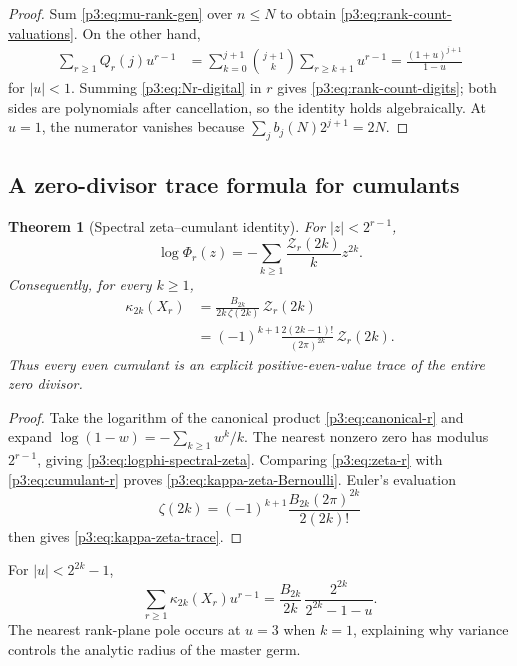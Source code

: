 \documentclass[11pt,oneside]{article}
\newtheorem{theorem}{Theorem}[section]
\theoremstyle{definition}
\theoremstyle{remark}
\begin{document}
\begin{proof}
Sum \eqref{p3:eq:mu-rank-gen} over $n\le N$ to obtain
\eqref{p3:eq:rank-count-valuations}.  On the other hand,
\begin{align*}
 \sum_{r\ge1}Q_r(j)u^{r-1}
 &=\sum_{k=0}^{j+1}\binom{j+1}{k}
   \sum_{r\ge k+1}u^{r-1}
 =\frac{(1+u)^{j+1}}{1-u}
\end{align*}
for $|u|<1$.  Summing \eqref{p3:eq:Nr-digital} in $r$ gives
\eqref{p3:eq:rank-count-digits}; both sides are polynomials after cancellation, so the identity holds algebraically.  At $u=1$, the numerator vanishes because
$\sum_jb_j(N)2^{j+1}=2N$.
\end{proof}

\subsection{A zero-divisor trace formula for cumulants}

\begin{theorem}[Spectral zeta--cumulant identity]\label{p3:thm:zeta-cumulant}
For $|z|<2^{r-1}$,
\begin{equation}\label{p3:eq:logphi-spectral-zeta}
 \boxed{\quad
 \log\Phi_r(z)=-\sum_{k\ge1}\frac{\mathcal Z_r(2k)}{k}z^{2k}.
 \quad}
\end{equation}
Consequently, for every $k\ge1$,
\begin{align}
 \kappa_{2k}(X_r)
 &=\frac{B_{2k}}{2k\,\zeta(2k)}\,\mathcal Z_r(2k)\label{p3:eq:kappa-zeta-Bernoulli}\\
 &=(-1)^{k+1}\frac{2(2k-1)!}{(2\pi)^{2k}}
   \,\mathcal Z_r(2k).\label{p3:eq:kappa-zeta-trace}
\end{align}
Thus every even cumulant is an explicit positive-even-value trace of the entire zero divisor.
\end{theorem}

\begin{proof}
Take the logarithm of the canonical product \eqref{p3:eq:canonical-r} and expand
$\log(1-w)=-\sum_{k\ge1}w^k/k$.  The nearest nonzero zero has modulus $2^{r-1}$, giving \eqref{p3:eq:logphi-spectral-zeta}.  Comparing \eqref{p3:eq:zeta-r} with \eqref{p3:eq:cumulant-r} proves \eqref{p3:eq:kappa-zeta-Bernoulli}.  Euler's evaluation
\[
 \zeta(2k)=(-1)^{k+1}
 \frac{B_{2k}(2\pi)^{2k}}{2(2k)!}
\]
then gives \eqref{p3:eq:kappa-zeta-trace}.
\end{proof}

\begin{corollary}\label{p3:cor:cumulant-rank-resolvent}
For $|u|<2^{2k}-1$,
\begin{equation}\label{p3:eq:cumulant-rank-resolvent}
 \sum_{r\ge1}\kappa_{2k}(X_r)u^{r-1}
 =\frac{B_{2k}}{2k}\,
  \frac{2^{2k}}{2^{2k}-1-u}.
\end{equation}
The nearest rank-plane pole occurs at $u=3$ when $k=1$, explaining why variance controls the analytic radius of the master germ.
\end{corollary}
\end{document}
